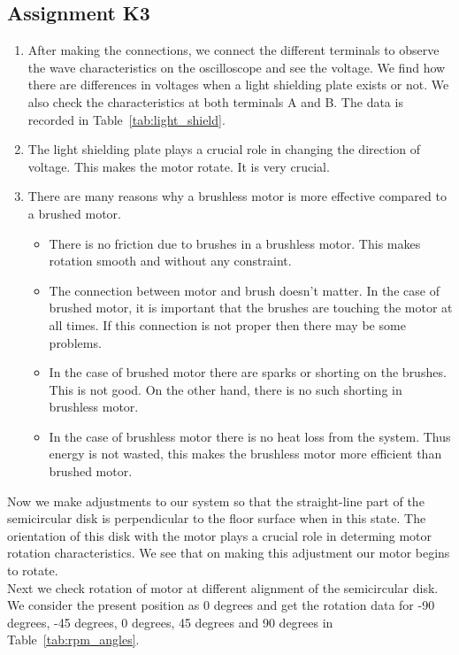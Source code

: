 \documentclass[12pt,a4paper]{report}
\begin{document}
\subsection{Assignment K3}
\begin{enumerate}
	\item After making the connections, we connect the different terminals to observe the wave characteristics on the oscilloscope and see the 
		voltage.
		We find how there are differences in voltages when a light shielding plate exists or not. We also check the characteristics at both 
		terminals A and B. The data is recorded in Table~\ref{tab:light_shield}. 
	\item The light shielding plate plays a crucial role in changing the direction of voltage. This makes the motor rotate. It is very crucial.
	\item There are many reasons why a brushless motor is more effective compared to a brushed motor. 
		\begin{itemize}
			\item There is no friction due to brushes in a brushless motor. This makes rotation smooth and without any constraint. 
			\item The connection between motor and brush doesn't matter. In the case of brushed motor, it is important that the brushes 
				are touching the motor at all times. If this connection is not proper then there may be some problems. 
			\item In the case of brushed motor there are sparks or shorting on the brushes. This is not good. On the other hand, there 
				is no such shorting in brushless motor. 
			\item In the case of brushless motor there is no heat loss from the system. Thus energy is not wasted, this makes the 
				brushless motor more efficient than brushed motor.
		\end{itemize}
\end{enumerate}
Now we make adjustments to our system so that the straight-line part of the semicircular disk is perpendicular to the floor surface when in this state. 
The orientation of this disk with the motor plays a crucial role in determing motor rotation characteristics. We see that on making this adjustment our motor begins to rotate. \\
Next we check rotation of motor at different alignment of the semicircular disk. We consider the present position as 0 degrees and get the rotation data for -90 degrees, -45 degrees, 0 degrees, 45 degrees and 90 degrees in Table~\ref{tab:rpm_angles}.
\end{document}
